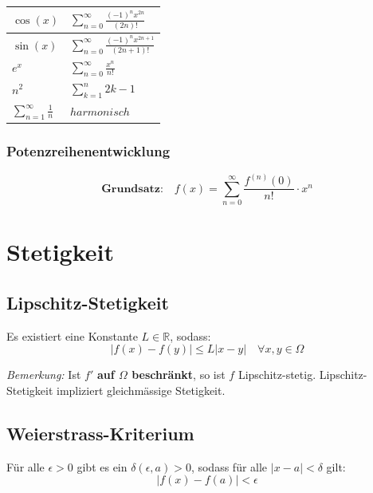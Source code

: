 \renewcommand{\arraystretch}{1.5}
\begin{table}[H]
	
	\begin{tabular}{l|l}
		$\cos(x)$ & $\sum^\infty_{n =0}\frac{(-1)^nx^{2n}}{(2n)!}$ \\\hline
		$\sin(x)$ & $\sum^\infty_{n =0}\frac{(-1)^nx^{2n+1}}{(2n+1)!}$ \\ \hline
		$e^x$ & $\sum^\infty_{n =0}\frac{x^n}{n!} $\\\hline
		$n^2$ & $\sum_{k=1}^n 2k-1$        \\\hline
		$\sum_{n=1}^{\infty}\frac{1}{n}$ & $harmonisch$
	\end{tabular}
\end{table}


\subsubsection{Potenzreihenentwicklung}

\begin{equation*}
	\textbf{Grundsatz:} \quad f(x) = \sum_{n=0}^\infty \frac{f^{(n)}(0)}{n!} \cdot x^n
\end{equation*}

\section{Stetigkeit}

\subsection{Lipschitz-Stetigkeit}
Es existiert eine Konstante $L\in \mathbb{R}$, sodass:
\begin{equation*}
	|f(x)-f(y)|\leq L|x-y| \quad \forall x,y \in \Omega
\end{equation*}

\emph{Bemerkung:} Ist $f'$ \textbf{auf $\Omega$ beschr{\"a}nkt}, so ist $f$ Lipschitz-stetig. Lipschitz-Stetigkeit impliziert gleichm{\"a}ssige Stetigkeit.

\subsection{Weierstrass-Kriterium}
F{\"u}r alle $\epsilon > 0$ gibt es ein $\delta(\epsilon, a) >0$, sodass f{\"u}r alle $|x-a|<\delta$ gilt:
\begin{equation*}
	|f(x) -f(a)|<\epsilon
\end{equation*}

